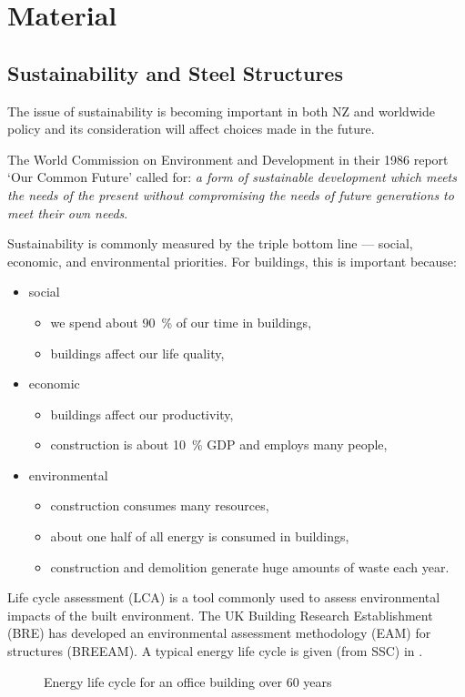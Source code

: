 \chapter{Material}
\section{Sustainability and Steel Structures}
The issue of sustainability is becoming important in both NZ and worldwide policy and its consideration will affect choices made in the future.

The World Commission on Environment and Development in their 1986 report `Our Common Future' called for: \textit{a form of sustainable development which meets the needs of the present without compromising the needs of future generations to meet their own needs}.

Sustainability is commonly measured by the triple bottom line --- social, economic, and environmental priorities.
For buildings, this is important because:
\begin{itemize}
\item social
\begin{itemize}
\item we spend about \SI{90}{\percent} of our time in buildings,
\item buildings affect our life quality,
\end{itemize}
\item economic
\begin{itemize}
\item buildings affect our productivity,
\item construction is about \SI{10}{\percent} GDP and employs many people,
\end{itemize}
\item environmental
\begin{itemize}
\item construction consumes many resources,
\item about one half of all energy is consumed in buildings,
\item construction and demolition generate huge amounts of waste each year.
\end{itemize}
\end{itemize}

Life cycle assessment (LCA) is a tool commonly used to assess environmental impacts of the built environment.
The UK Building Research Establishment (BRE) has developed an environmental assessment methodology (EAM) for structures (BREEAM).
A typical energy life cycle is given (from SSC) in .
\begin{figure}[H]
\centering

\caption{Energy life cycle for an office building over \num{60} years}\label{fig:life_cycle}
\end{figure}

